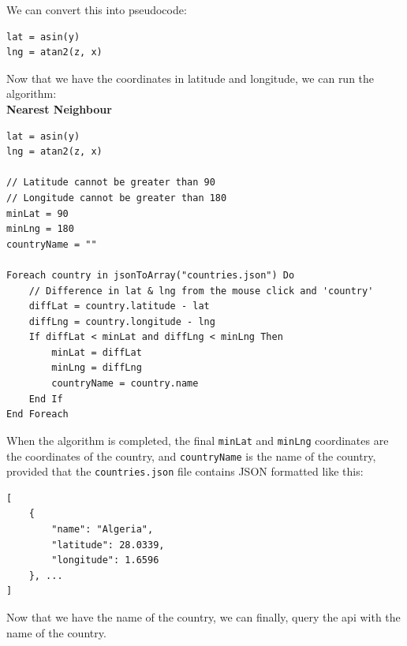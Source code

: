 We can convert this into pseudocode:
\begin{lstlisting}
lat = asin(y)
lng = atan2(z, x)
\end{lstlisting}
Now that we have the coordinates in latitude and longitude, we can run the algorithm: \\
\newpage
\textbf{Nearest Neighbour}
\begin{lstlisting}
lat = asin(y)
lng = atan2(z, x)

// Latitude cannot be greater than 90
// Longitude cannot be greater than 180
minLat = 90
minLng = 180
countryName = ""

Foreach country in jsonToArray("countries.json") Do
    // Difference in lat & lng from the mouse click and 'country'
    diffLat = country.latitude - lat
    diffLng = country.longitude - lng
    If diffLat < minLat and diffLng < minLng Then
        minLat = diffLat
        minLng = diffLng
        countryName = country.name
    End If
End Foreach
\end{lstlisting}

When the algorithm is completed, the final \verb|minLat| and \verb|minLng| coordinates are the coordinates of the country, and \verb|countryName| is the name of the country, provided that the \verb|countries.json| file contains JSON formatted like this:

\begin{lstlisting}
[
    {
        "name": "Algeria",
        "latitude": 28.0339,
        "longitude": 1.6596
    }, ...
]
\end{lstlisting}
Now that we have the name of the country, we can finally, query the api with the name of the country.


